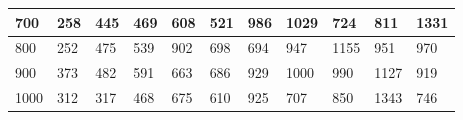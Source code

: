 \documentclass[10pt,letterpaper]{article}
\begin{document}
\begin{center}
\begin{table}
\begin{tabular} { |m{0.5cm}|m{1.3cm}|m{1.3cm}|m{1.3cm}|m{1.3cm}|m{1.3cm}|m{1.3cm}|m{1.3cm}|m{1.3cm}|m{1.3cm}|m{1.3cm}|}
\hline
\cellcolor{Gray}700 & \Large 258 & \Large 445 & \Large 469 & \Large 608 & \Large 521 & \Large 986 & \Large 1029 & \Large 724 & \Large 811 & \Large 1331 \\
\hline
\cellcolor{Gray}800 & \Large 252 & \Large 475 & \Large 539 & \Large 902 & \Large 698 & \Large 694 & \Large 947 & \Large 1155 & \Large 951 & \Large 970 \\
\hline
\cellcolor{Gray}900 & \Large 373 & \Large 482 & \Large 591 & \Large 663 & \Large 686 & \Large 929 & \Large 1000 & \Large 990 & \Large 1127 & \Large 919 \\
\hline
\cellcolor{Gray}1000 & \Large 312 & \Large 317 & \Large 468 & \Large 675 & \Large 610 & \Large 925 & \Large 707 & \Large 850 & \Large 1343 & \Large 746 \\
\hline
\end{tabular} \\
\end{table}
\end{center}
\newpage 
{}
\end{document}

